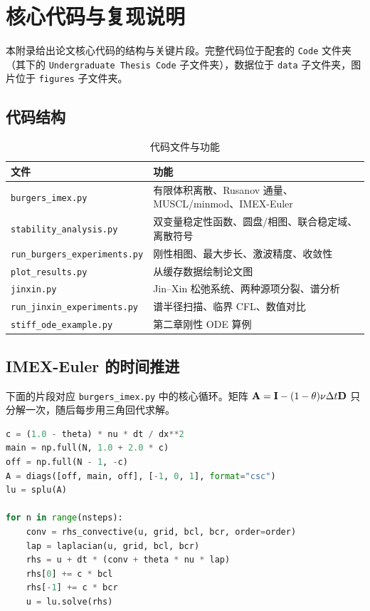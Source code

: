 \chapter{核心代码与复现说明}

本附录给出论文核心代码的结构与关键片段。完整代码位于配套的 \texttt{Code} 文件夹（其下的 \texttt{Undergraduate Thesis Code} 子文件夹），数据位于 \texttt{data} 子文件夹，图片位于 \texttt{figures} 子文件夹。

\section{代码结构}

\begin{table}[htbp]
  \centering
  \small
  \caption{代码文件与功能}
  \label{tab:code-files}
  \begin{tabularx}{\textwidth}{lX}
    \toprule
    文件 & 功能 \\
    \midrule
    \texttt{burgers\_imex.py} & 有限体积离散、Rusanov 通量、MUSCL/minmod、IMEX-Euler \\
    \texttt{stability\_analysis.py} & 双变量稳定性函数、圆盘/相图、联合稳定域、离散符号 \\
    \texttt{run\_burgers\_experiments.py} & 刚性相图、最大步长、激波精度、收敛性 \\
    \texttt{plot\_results.py} & 从缓存数据绘制论文图 \\
    \texttt{jinxin.py} & Jin--Xin 松弛系统、两种源项分裂、谱分析 \\
    \texttt{run\_jinxin\_experiments.py} & 谱半径扫描、临界 CFL、数值对比 \\
    \texttt{stiff\_ode\_example.py} & 第二章刚性 ODE 算例 \\
    \bottomrule
  \end{tabularx}
\end{table}

\clearpage
\section{IMEX-Euler 的时间推进}

下面的片段对应 \texttt{burgers\_imex.py} 中的核心循环。矩阵 ${\mathbf{A}}={\mathbf{I}}-(1-\theta)\nu\Delta t{\mathbf{D}}$ 只分解一次，随后每步用三角回代求解。

\begin{lstlisting}[language=Python,caption={IMEX-Euler 时间推进的核心循环}]
c = (1.0 - theta) * nu * dt / dx**2
main = np.full(N, 1.0 + 2.0 * c)
off = np.full(N - 1, -c)
A = diags([off, main, off], [-1, 0, 1], format="csc")
lu = splu(A)

for n in range(nsteps):
    conv = rhs_convective(u, grid, bcl, bcr, order=order)
    lap = laplacian(u, grid, bcl, bcr)
    rhs = u + dt * (conv + theta * nu * lap)
    rhs[0] += c * bcl
    rhs[-1] += c * bcr
    u = lu.solve(rhs)
\end{lstlisting}

